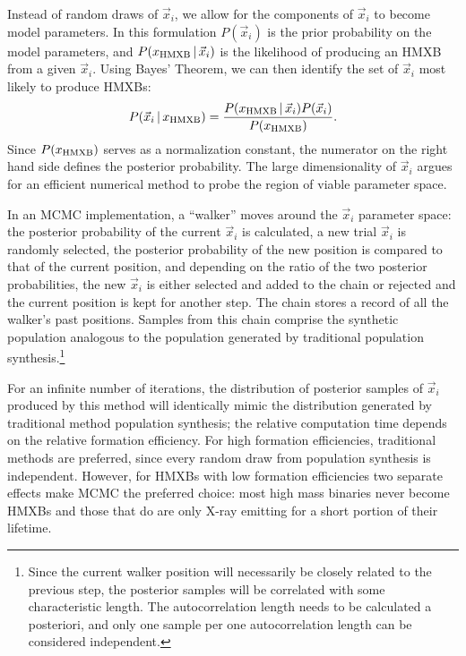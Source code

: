 \documentclass[usenatbib]{mnras}
\newcommand{\given}{\,|\,}
\begin{document}
Instead of random draws of $\vec{x}_i$, we allow for the components of $\vec{x}_i$ to become model parameters. In this formulation $P(\vec{x}_i)$ is the prior probability on the model parameters, and $P(x_{\rm HMXB} \given \vec{x}_i)$ is the likelihood of producing an HMXB from a given $\vec{x}_i$. Using Bayes' Theorem, we can then identify the set of $\vec{x}_i$ most likely to produce HMXBs:
\begin{equation}
P(\vec{x}_i \given x_{\rm HMXB}) = \frac{P(x_{\rm HMXB} \given \vec{x}_i) P(\vec{x}_i)} {P(x_{\rm HMXB})}. \label{eq:bayes_pop}
\end{equation}
Since $P(x_{\rm HMXB})$ serves as a normalization constant, the numerator on the right hand side defines the posterior probability. The large dimensionality of $\vec{x}_i$ argues for an efficient numerical method to probe the region of viable parameter space.


In an MCMC implementation, a ``walker'' moves around the $\vec{x}_i$ parameter space: the posterior probability of the current $\vec{x}_i$ is calculated, a new trial $\vec{x}_i$ is randomly selected, the posterior probability of the new position is compared to that of the current position, and depending on the ratio of the two posterior probabilities, the new $\vec{x}_i$ is either selected and added to the chain or rejected and the current position is kept for another step. The chain stores a record of all the walker's past positions. Samples from this chain comprise the synthetic population analogous to the population generated by traditional population synthesis.\footnote{Since the current walker position will necessarily be closely related to the previous step, the posterior samples will be correlated with some characteristic length. The autocorrelation length needs to be calculated a posteriori, and only one sample per one autocorrelation length can be considered independent.}


For an infinite number of iterations, the distribution of posterior samples of $\vec{x}_i$ produced by this method will identically mimic the distribution generated by traditional method population synthesis; the relative computation time depends on the relative formation efficiency. For high formation efficiencies, traditional methods are preferred, since every random draw from population synthesis is independent. However, for HMXBs with low formation efficiencies two separate effects make MCMC the preferred choice: most high mass binaries never become HMXBs and those that do are only X-ray emitting for a short portion of their lifetime.
\end{document}
